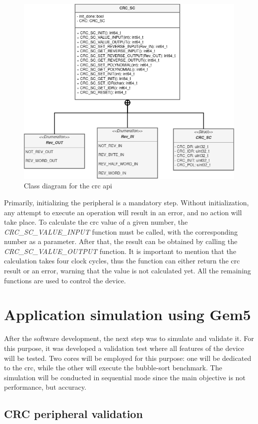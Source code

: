 \begin{figure}[H]
	\centering
 	\includegraphics[width=0.7\linewidth]{Images/CRC_API_Class_Diagram.png} 
 	\caption{Class diagram for the \gls{crc} \gls{api}}
\end{figure}

Primarily, initializing the peripheral is a mandatory step. Without initialization, any attempt to execute an operation will 
result in an error, and no action will take place. To calculate the \gls{crc} value of a given number, the \textit{CRC\_SC\_VALUE\_INPUT} 
function must be called, with the corresponding number as a parameter. After that, the result can be obtained by calling the 
\textit{CRC\_SC\_VALUE\_OUTPUT} function. It is important to mention that the calculation takes four clock cycles, thus the function can 
either return the \gls{crc} result or an error, warning that the value is not calculated yet. All the remaining functions are used to
control the device.

\section{Application simulation using Gem5}

After the software development, the next step was to simulate and validate it. For this purpose, it was developed a validation test where
all features of the device will be tested. Two cores will be employed for this purpose: one will be dedicated to the 
\gls*{crc}, while the other will execute the bubble-sort benchmark. The simulation will be conducted in sequential mode since 
the main objective is not performance, but accuracy.


\subsection{CRC peripheral validation} 

